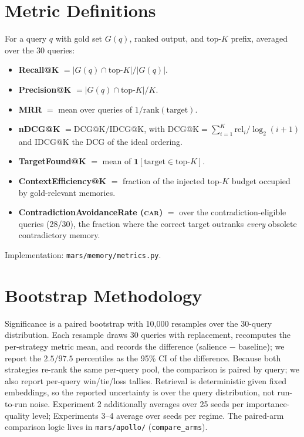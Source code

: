\documentclass[11pt]{article}
\newcommand{\car}{\textsc{car}}
\begin{document}
\section{Metric Definitions}
\label{app:metrics}
For a query $q$ with gold set $G(q)$, ranked output, and top-$K$ prefix, averaged over the
30 queries:
\begin{itemize}[leftmargin=1.4em,itemsep=2pt]
\item \textbf{Recall@K} $= |G(q)\cap \mathrm{top}\text{-}K| / |G(q)|$.
\item \textbf{Precision@K} $= |G(q)\cap \mathrm{top}\text{-}K| / K$.
\item \textbf{MRR} $=$ mean over queries of $1/\mathrm{rank}(\mathrm{target})$.
\item \textbf{nDCG@K} $= \mathrm{DCG@K}/\mathrm{IDCG@K}$, with
$\mathrm{DCG@K} = \sum_{i=1}^{K} \mathrm{rel}_i / \log_2(i+1)$ and $\mathrm{IDCG@K}$ the DCG
of the ideal ordering.
\item \textbf{TargetFound@K} $=$ mean of $\mathbf{1}[\mathrm{target}\in \mathrm{top}\text{-}K]$.
\item \textbf{ContextEfficiency@K} $=$ fraction of the injected top-$K$ budget occupied by
gold-relevant memories.
\item \textbf{ContradictionAvoidanceRate (\car)} $=$ over the contradiction-eligible queries
(28/30), the fraction where the correct target outranks \emph{every} obsolete contradictory
memory.
\end{itemize}
Implementation: \texttt{mars/memory/metrics.py}.

\section{Bootstrap Methodology}
\label{app:bootstrap}
Significance is a paired bootstrap with 10{,}000 resamples over the 30-query distribution.
Each resample draws 30 queries with replacement, recomputes the per-strategy metric mean,
and records the difference (salience $-$ baseline); we report the $2.5/97.5$ percentiles as
the 95\% CI of the difference. Because both strategies re-rank the same per-query pool, the
comparison is paired by query; we also report per-query win/tie/loss tallies. Retrieval is
deterministic given fixed embeddings, so the reported uncertainty is over the query
distribution, not run-to-run noise. Experiment 2 additionally averages over 25 seeds per
importance-quality level; Experiments 3--4 average over seeds per regime. The paired-arm
comparison logic lives in \texttt{mars/apollo/} (\texttt{compare\_arms}).
\end{document}
